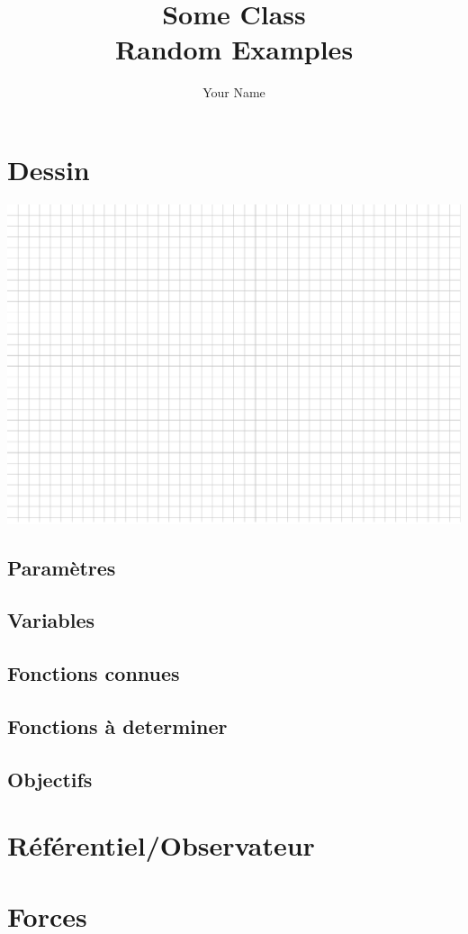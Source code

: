 \documentclass[14pt]{extreport}
\title{\Huge{Some Class}\\Random Examples}
\author{\huge{Your Name}}
\date{}
\begin{document}
\section*{Dessin}
\includegraphics[width=\textwidth]{test_xournalpp.pdf}


\subsection*{Paramètres}


\subsection*{Variables}


\subsection*{Fonctions connues}


\subsection*{Fonctions à determiner}


\subsection*{Objectifs}


\section*{Référentiel/Observateur}


\section*{Forces}
\end{document}
